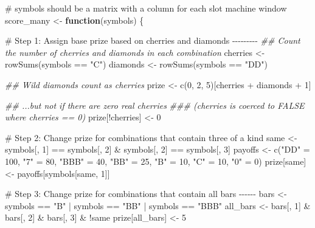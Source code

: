 \documentclass[
  letterpaper,
  DIV=11,
  numbers=noendperiod]{scrbook}
\newenvironment{Shaded}{\begin{snugshade}}{\end{snugshade}}
\newcommand{\CommentTok}[1]{\textcolor[rgb]{0.37,0.37,0.37}{#1}}
\newcommand{\ControlFlowTok}[1]{\textcolor[rgb]{0.00,0.23,0.31}{\textbf{#1}}}
\newcommand{\DecValTok}[1]{\textcolor[rgb]{0.68,0.00,0.00}{#1}}
\newcommand{\DocumentationTok}[1]{\textcolor[rgb]{0.37,0.37,0.37}{\textit{#1}}}
\newcommand{\FunctionTok}[1]{\textcolor[rgb]{0.28,0.35,0.67}{#1}}
\newcommand{\NormalTok}[1]{\textcolor[rgb]{0.00,0.23,0.31}{#1}}
\newcommand{\OtherTok}[1]{\textcolor[rgb]{0.00,0.23,0.31}{#1}}
\newcommand{\SpecialCharTok}[1]{\textcolor[rgb]{0.37,0.37,0.37}{#1}}
\newcommand{\StringTok}[1]{\textcolor[rgb]{0.13,0.47,0.30}{#1}}
\begin{document}
\begin{Shaded}
\begin{Highlighting}[]
\CommentTok{\# symbols should be a matrix with a column for each slot machine window}
\NormalTok{score\_many }\OtherTok{\textless{}{-}} \ControlFlowTok{function}\NormalTok{(symbols) \{}

  \CommentTok{\# Step 1: Assign base prize based on cherries and diamonds {-}{-}{-}{-}{-}{-}{-}{-}{-}}
  \DocumentationTok{\#\# Count the number of cherries and diamonds in each combination}
\NormalTok{  cherries }\OtherTok{\textless{}{-}} \FunctionTok{rowSums}\NormalTok{(symbols }\SpecialCharTok{==} \StringTok{"C"}\NormalTok{)}
\NormalTok{  diamonds }\OtherTok{\textless{}{-}} \FunctionTok{rowSums}\NormalTok{(symbols }\SpecialCharTok{==} \StringTok{"DD"}\NormalTok{) }
  
  \DocumentationTok{\#\# Wild diamonds count as cherries}
\NormalTok{  prize }\OtherTok{\textless{}{-}} \FunctionTok{c}\NormalTok{(}\DecValTok{0}\NormalTok{, }\DecValTok{2}\NormalTok{, }\DecValTok{5}\NormalTok{)[cherries }\SpecialCharTok{+}\NormalTok{ diamonds }\SpecialCharTok{+} \DecValTok{1}\NormalTok{]}
  
  \DocumentationTok{\#\# ...but not if there are zero real cherries }
  \DocumentationTok{\#\#\# (cherries is coerced to FALSE where cherries == 0)}
\NormalTok{  prize[}\SpecialCharTok{!}\NormalTok{cherries] }\OtherTok{\textless{}{-}} \DecValTok{0}
  
  \CommentTok{\# Step 2: Change prize for combinations that contain three of a kind }
\NormalTok{  same }\OtherTok{\textless{}{-}}\NormalTok{ symbols[, }\DecValTok{1}\NormalTok{] }\SpecialCharTok{==}\NormalTok{ symbols[, }\DecValTok{2}\NormalTok{] }\SpecialCharTok{\&} 
\NormalTok{    symbols[, }\DecValTok{2}\NormalTok{] }\SpecialCharTok{==}\NormalTok{ symbols[, }\DecValTok{3}\NormalTok{]}
\NormalTok{  payoffs }\OtherTok{\textless{}{-}} \FunctionTok{c}\NormalTok{(}\StringTok{"DD"} \OtherTok{=} \DecValTok{100}\NormalTok{, }\StringTok{"7"} \OtherTok{=} \DecValTok{80}\NormalTok{, }\StringTok{"BBB"} \OtherTok{=} \DecValTok{40}\NormalTok{, }
    \StringTok{"BB"} \OtherTok{=} \DecValTok{25}\NormalTok{, }\StringTok{"B"} \OtherTok{=} \DecValTok{10}\NormalTok{, }\StringTok{"C"} \OtherTok{=} \DecValTok{10}\NormalTok{, }\StringTok{"0"} \OtherTok{=} \DecValTok{0}\NormalTok{)}
\NormalTok{  prize[same] }\OtherTok{\textless{}{-}}\NormalTok{ payoffs[symbols[same, }\DecValTok{1}\NormalTok{]]}
  
  \CommentTok{\# Step 3: Change prize for combinations that contain all bars {-}{-}{-}{-}{-}{-}}
\NormalTok{  bars }\OtherTok{\textless{}{-}}\NormalTok{ symbols }\SpecialCharTok{==} \StringTok{"B"} \SpecialCharTok{|}\NormalTok{ symbols }\SpecialCharTok{==}  \StringTok{"BB"} \SpecialCharTok{|}\NormalTok{ symbols }\SpecialCharTok{==} \StringTok{"BBB"}
\NormalTok{  all\_bars }\OtherTok{\textless{}{-}}\NormalTok{ bars[, }\DecValTok{1}\NormalTok{] }\SpecialCharTok{\&}\NormalTok{ bars[, }\DecValTok{2}\NormalTok{] }\SpecialCharTok{\&}\NormalTok{ bars[, }\DecValTok{3}\NormalTok{] }\SpecialCharTok{\&} \SpecialCharTok{!}\NormalTok{same}
\NormalTok{  prize[all\_bars] }\OtherTok{\textless{}{-}} \DecValTok{5}
  

\end{Highlighting}
\end{Shaded}
\end{document}
